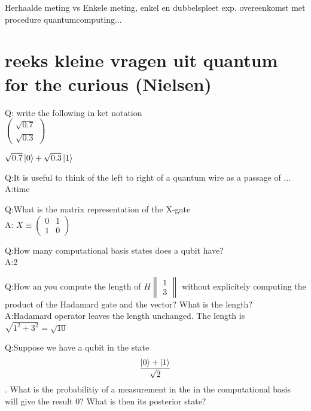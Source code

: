 \documentclass[a4paper, addpoints, 12pt
    , answers    %
    ]{exam}
\begin{document}
\begin{questions}

\question[]
Herhaalde meting vs Enkele meting, enkel en dubbelspleet exp. overeenkomst met procedure quantumcomputing...

\section*{reeks kleine vragen uit quantum for the curious (Nielsen)}
Q: write the following in ket notation\\
$\begin{pmatrix}
\sqrt{0.7}\\
\sqrt{0.3}
\end{pmatrix}
$

$\sqrt{0.7} \ket{0}+\sqrt{0.3}\ket{1}$


Q:It is useful to think of the left to right of a quantum wire as a passage of ...
\\
A:time

Q:What is the matrix representation of the X-gate\\
A:
$X \equiv \begin{pmatrix}
0&1\\
1&0
\end{pmatrix}
$

Q:How many computational basis states does a qubit have?\\
A:2

Q:How an you compute the length of
$H\begin{Vmatrix}
1\\
3
\end{Vmatrix}
$
without explicitely computing the product of the Hadamard gate and the vector?
What is the length?\\

A:Hadamard operator leaves the length unchanged. The length is $\sqrt{1^2+3^2}=\sqrt{10}$

Q:Suppose we have a qubit in the state
$$\frac{\ket{0}+\ket{1}}{\sqrt{2}}$$. What is the probabilitiy of a measurement in the in the computational basis will give the result 0? What is then its posterior state? 


\end{questions}
\end{document}
